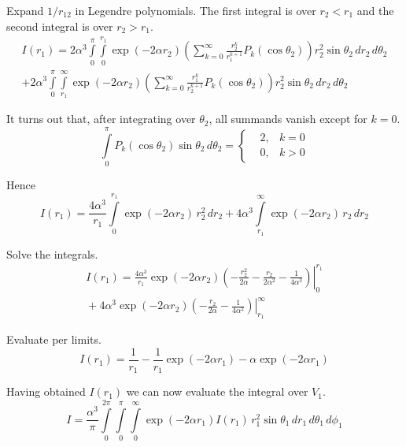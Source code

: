 \documentclass[12pt]{article}
\begin{document}
\noindent
Expand $1/r_{12}$ in Legendre polynomials.
The first integral is over $r_2<r_1$ and the second integral is over $r_2>r_1$.
\begin{multline*}
I(r_1)=
2\alpha^3\int\limits_0^\pi\int\limits_0^{r_1}
\exp(-2\alpha r_2)
\left(\sum_{k=0}^\infty\frac{r_2^k}{r_1^{k+1}}P_k(\cos\theta_2)\right)
r_2^2\sin\theta_2\,dr_2\,d\theta_2
\\
+2\alpha^3\int\limits_0^\pi\int\limits_{r_1}^\infty
\exp(-2\alpha r_2)
\left(\sum_{k=0}^\infty\frac{r_1^k}{r_2^{k+1}}P_k(\cos\theta_2)\right)
r_2^2\sin\theta_2\,dr_2\,d\theta_2
\end{multline*}

\noindent
It turns out that, after integrating over $\theta_2$, all summands vanish except for $k=0$.
\begin{equation*}
\int\limits_0^\pi P_k(\cos\theta_2)\sin\theta_2\,d\theta_2=
\left\{
\begin{aligned}
&2, & k=0
\\
&0, & k>0
\end{aligned}\right.
\tag{5}
\end{equation*}

\noindent
Hence
\begin{equation*}
I(r_1)=
\frac{4\alpha^3}{r_1}\int\limits_0^{r_1}\exp(-2\alpha r_2)\,r_2^2\,dr_2
+4\alpha^3\int\limits_{r_1}^\infty\exp(-2\alpha r_2)\,r_2\,dr_2
\end{equation*}

\noindent
Solve the integrals.
\begin{multline*}
I(r_1)=
\frac{4\alpha^3}{r_1}
\left.
\exp(-2\alpha r_2)\left(-\frac{r_2^2}{2\alpha}-\frac{r_2}{2\alpha^2}-\frac{1}{4\alpha^3}
\right)\right|_0^{r_1}
\\
{}+4\alpha^3\left.\exp(-2\alpha r_2)\left(-\frac{r_2}{2\alpha}-\frac{1}{4\alpha^2}\right)\right|_{r_1}^\infty
\end{multline*}

\noindent
Evaluate per limits.
\begin{equation*}
I(r_1)=\frac{1}{r_1}-\frac{1}{r_1}\exp(-2\alpha r_1)-\alpha\exp(-2\alpha r_1)
\tag{6}
\end{equation*}

\noindent
Having obtained $I(r_1)$ we can now evaluate the integral over $V_1$.
\begin{equation*}
I=\frac{\alpha^3}{\pi}\int\limits_0^{2\pi}\int\limits_0^\pi\int\limits_0^\infty
\exp(-2\alpha r_1)I(r_1)\,r_1^2\sin\theta_1\,dr_1\,d\theta_1\,d\phi_1
\end{equation*}
\end{document}

